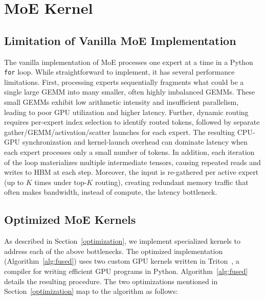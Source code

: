 \documentclass[runningheads]{llncs}
\begin{document}
\section{MoE Kernel}
\label{appx_kernel}

\subsection{Limitation of Vanilla MoE Implementation}

The vanilla implementation of MoE processes one expert at a time in a Python \texttt{for} loop. While straightforward to implement, it has
several performance limitations. First, processing experts sequentially fragments what could be a single large GEMM into many smaller, often highly imbalanced GEMMs. These small GEMMs exhibit low arithmetic intensity and insufficient parallelism, leading to poor GPU utilization and higher latency. Further, dynamic routing requires per-expert index selection to identify routed tokens, followed by separate gather/GEMM/activation/scatter launches for each expert. The resulting CPU-GPU synchronization and kernel-launch overhead can dominate latency when each expert processes only a small number of tokens. In addition, each iteration of the loop materializes multiple intermediate tensors, causing repeated reads and writes to HBM at each step. Moreover, the input is re-gathered per active expert (up to $K$ times under top-$K$ routing), creating redundant memory traffic that often makes bandwidth, instead of compute, the latency bottleneck.

\subsection{Optimized MoE Kernels}
\label{app:fused}


As described in Section~\ref{optimization}, we implement specialized kernels to address each of the above bottlenecks. The optimized implementation (Algorithm~\ref{alg:fused}) uses two custom GPU kernels written in
Triton~\cite{triton}, a compiler for writing efficient GPU programs
in Python. Algorithm~\ref{alg:fused} details the resulting procedure. The two optimizations mentioned in Section~\ref{optimization} map to the algorithm as
follows:
\end{document}
